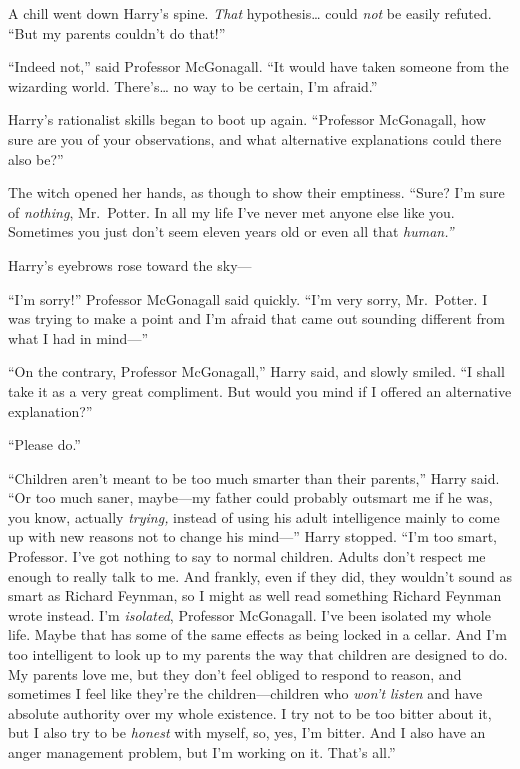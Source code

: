 A chill went down Harry's spine. \emph{That} hypothesis\ldots{} could
\emph{not} be easily refuted. ``But my parents couldn't do that!''

``Indeed not,'' said Professor McGonagall. ``It would have taken someone
from the wizarding world. There's\ldots{} no way to be certain, I'm
afraid.''

Harry's rationalist skills began to boot up again. ``Professor
McGonagall, how sure are you of your observations, and what alternative
explanations could there also be?''

The witch opened her hands, as though to show their emptiness. ``Sure?
I'm sure of \emph{nothing}, Mr.~Potter. In all my life I've never met
anyone else like you. Sometimes you just don't seem eleven years old or
even all that \emph{human.''}

Harry's eyebrows rose toward the sky---

``I'm sorry!'' Professor McGonagall said quickly. ``I'm very sorry,
Mr.~Potter. I was trying to make a point and I'm afraid that came out
sounding different from what I had in mind---''

``On the contrary, Professor McGonagall,'' Harry said, and slowly
smiled. ``I shall take it as a very great compliment. But would you mind
if I offered an alternative explanation?''

``Please do.''

``Children aren't meant to be too much smarter than their parents,''
Harry said. ``Or too much saner, maybe---my father could probably
outsmart me if he was, you know, actually \emph{trying,} instead of
using his adult intelligence mainly to come up with new reasons not to
change his mind---'' Harry stopped. ``I'm too smart, Professor. I've got
nothing to say to normal children. Adults don't respect me enough to
really talk to me. And frankly, even if they did, they wouldn't sound as
smart as Richard Feynman, so I might as well read something Richard
Feynman wrote instead. I'm \emph{isolated}, Professor McGonagall. I've
been isolated my whole life. Maybe that has some of the same effects as
being locked in a cellar. And I'm too intelligent to look up to my
parents the way that children are designed to do. My parents love me,
but they don't feel obliged to respond to reason, and sometimes I feel
like they're the children---children who \emph{won't listen} and have
absolute authority over my whole existence. I try not to be too bitter
about it, but I also try to be \emph{honest} with myself, so, yes, I'm
bitter. And I also have an anger management problem, but I'm working on
it. That's all.''


